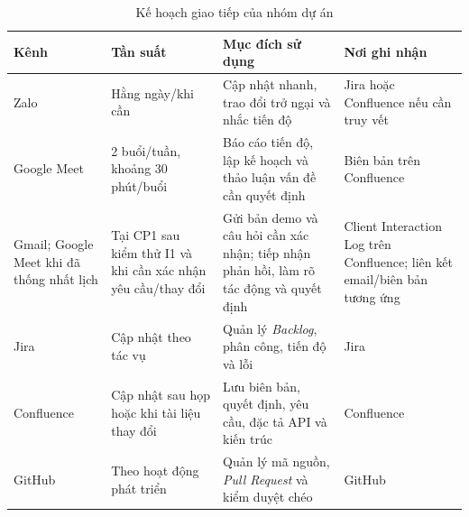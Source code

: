 \begin{table}[H]
\centering
\renewcommand{\arraystretch}{1.2}
\begin{tabularx}{\textwidth}{|p{2.5cm}|p{3cm}|X|p{2.7cm}|}
\hline
\textbf{Kênh} & \textbf{Tần suất} & \textbf{Mục đích sử dụng} & \textbf{Nơi ghi nhận} \\
\hline
Zalo & Hằng ngày/khi cần & Cập nhật nhanh, trao đổi trở ngại và nhắc tiến độ & Jira hoặc Confluence nếu cần truy vết \\
\hline
Google Meet & 2 buổi/tuần, khoảng 30 phút/buổi & Báo cáo tiến độ, lập kế hoạch và thảo luận vấn đề cần quyết định & Biên bản trên Confluence \\
\hline
Gmail; Google Meet khi đã thống nhất lịch & Tại CP1 sau kiểm thử I1 và khi cần xác nhận yêu cầu/thay đổi & Gửi bản demo và câu hỏi cần xác nhận; tiếp nhận phản hồi, làm rõ tác động và quyết định & Client Interaction Log trên Confluence; liên kết email/biên bản tương ứng \\
\hline
Jira & Cập nhật theo tác vụ & Quản lý \textit{Backlog}, phân công, tiến độ và lỗi & Jira \\
\hline
Confluence & Cập nhật sau họp hoặc khi tài liệu thay đổi & Lưu biên bản, quyết định, yêu cầu, đặc tả API và kiến trúc & Confluence \\
\hline
GitHub & Theo hoạt động phát triển & Quản lý mã nguồn, \textit{Pull Request} và kiểm duyệt chéo & GitHub \\
\hline
\end{tabularx}
\caption{Kế hoạch giao tiếp của nhóm dự án}
\label{tab:communication-plan}
\end{table}